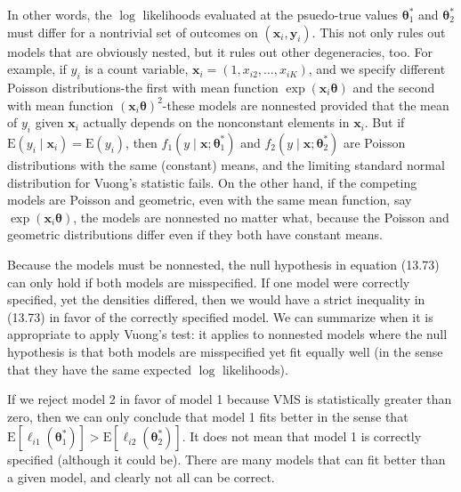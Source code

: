 \documentclass[10pt]{article}
\begin{document}
In other words, the $\log$ likelihoods evaluated at the psuedo-true values $\boldsymbol{\theta}_{1}^{*}$ and $\boldsymbol{\theta}_{2}^{*}$ must differ for a nontrivial set of outcomes on $\left(\mathbf{x}_{i}, \mathbf{y}_{i}\right)$. This not only rules out models that are obviously nested, but it rules out other degeneracies, too. For example, if $y_{i}$ is a count variable, $\mathbf{x}_{i}=\left(1, x_{i 2}, \ldots, x_{i K}\right)$, and we specify different Poisson distributions-the first with mean function $\exp \left(\mathbf{x}_{i} \boldsymbol{\theta}\right)$ and the second with mean function $\left(\mathbf{x}_{i} \boldsymbol{\theta}\right)^{2}$-these models are nonnested provided that the mean of $y_{i}$ given $\mathbf{x}_{i}$ actually depends on the nonconstant elements in $\mathbf{x}_{i}$. But if $\mathrm{E}\left(y_{i} \mid \mathbf{x}_{i}\right)=\mathrm{E}\left(y_{i}\right)$, then $f_{1}\left(y \mid \mathbf{x} ; \boldsymbol{\theta}_{1}^{*}\right)$ and $f_{2}\left(y \mid \mathbf{x} ; \boldsymbol{\theta}_{2}^{*}\right)$ are Poisson distributions with the same (constant) means, and the limiting standard normal distribution for Vuong's statistic fails. On the other hand, if the competing models are Poisson and geometric, even with the same mean function, say $\exp \left(\mathbf{x}_{i} \boldsymbol{\theta}\right)$, the models are nonnested no matter what, because the Poisson and geometric distributions differ even if they both have constant means.

Because the models must be nonnested, the null hypothesis in equation (13.73) can only hold if both models are misspecified. If one model were correctly specified, yet the densities differed, then we would have a strict inequality in (13.73) in favor of the correctly specified model. We can summarize when it is appropriate to apply Vuong's test: it applies to nonnested models where the null hypothesis is that both models are misspecified yet fit equally well (in the sense that they have the same expected $\log$ likelihoods).

If we reject model 2 in favor of model 1 because VMS is statistically greater than zero, then we can only conclude that model 1 fits better in the sense that $\mathrm{E}\left[\ell_{i 1}\left(\boldsymbol{\theta}_{1}^{*}\right)\right]>\mathrm{E}\left[\ell_{i 2}\left(\boldsymbol{\theta}_{2}^{*}\right)\right]$. It does not mean that model 1 is correctly specified (although it could be). There are many models that can fit better than a given model, and clearly not all can be correct.
\end{document}
